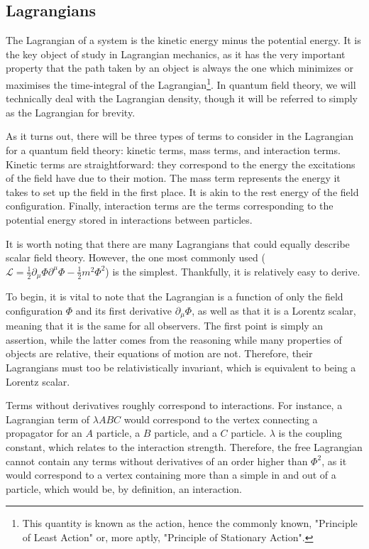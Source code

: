 \documentclass{report}
\begin{document}
\begin{appendices}
\chapter{Lagrangians}
The Lagrangian of a system is the kinetic energy minus the potential energy. It is the key object of study in Lagrangian mechanics, as it has the very important property that the path taken by an object is always the one which minimizes or maximises the time-integral of the Lagrangian\footnote{This quantity is known as the action, hence the commonly known, "Principle of Least Action" or, more aptly, "Principle of Stationary Action".}. In quantum field theory, we will technically deal with the Lagrangian density, though it will be referred to simply as the Lagrangian for brevity.

As it turns out, there will be three types of terms to consider in the Lagrangian for a quantum field theory: kinetic terms, mass terms, and interaction terms. Kinetic terms are straightforward: they correspond to the energy the excitations of the field have due to their motion. The mass term represents the energy it takes to set up the field in the first place. It is akin to the rest energy of the field configuration. Finally, interaction terms are the terms corresponding to the potential energy stored in interactions between particles.

It is worth noting that there are many Lagrangians that could equally describe scalar field theory. However, the one most commonly used ($\mathcal{L} = \frac{1}{2}\partial_\mu\Phi\partial^\mu\Phi - \frac{1}{2}m^2\Phi^2$) is the simplest. Thankfully, it is relatively easy to derive.

To begin, it is vital to note that the Lagrangian is a function of only the field configuration $\Phi$ and its first derivative $\partial_\mu\Phi$, as well as that it is a Lorentz scalar, meaning that it is the same for all observers. The first point is simply an assertion, while the latter comes from the reasoning while many properties of objects are relative, their equations of motion are not. Therefore, their Lagrangians must too be relativistically invariant, which is equivalent to being a Lorentz scalar.

Terms without derivatives roughly correspond to interactions. For instance, a Lagrangian term of $\lambda ABC$ would correspond to the vertex connecting a propagator for an $A$ particle, a $B$ particle, and a $C$ particle. $\lambda$ is the coupling constant, which relates to the interaction strength. Therefore, the free Lagrangian cannot contain any terms without derivatives of an order higher than $\Phi^2$, as it would correspond to a vertex containing more than a simple in and out of a particle, which would be, by definition, an interaction.


\end{appendices}
\end{document}

